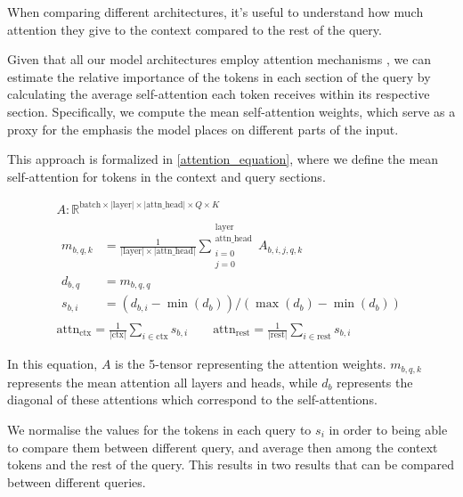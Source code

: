 When comparing different architectures, it's useful to understand how much attention they give to the context compared to the rest of the query.

Given that all our model architectures employ attention mechanisms \citep{flant5,llama3}, we can estimate the relative importance of the tokens in each section of the query by calculating the average self-attention each token receives within its respective section.
Specifically, we compute the mean self-attention weights, which serve as a proxy for the emphasis the model places on different parts of the input.

This approach is formalized in \cref{attention_equation}, where we define the mean self-attention for tokens in the context and query sections.

\begin{equation}
	\newcommand{\lenmod}[1]{\left| \text{#1} \right|}
	\begin{gathered}
		A : \mathbb{R} ^ { \text{batch} \times \lenmod{layer}  \times \lenmod{attn\_head} \times Q \times K } \\[1ex]
		\begin{aligned}
			m_{b,q,k} &= \frac{1}{ \lenmod{layer} \times \lenmod{attn\_head} } \sum^{\substack{\text{layer} \\ \text{attn\_head}}}_{\substack{i = 0 \\ j = 0}} A_{b,i,j,q,k} \\
			d_{b, q} &= m_{b, q, q} \\
			s_{b, i} &= \left(d_{b, i} - \min{\left( d_b \right)}\right) / \left(\max{\left( d_b \right)} - \min{\left( d_b \right)} \right)
		\end{aligned} \\[1em]
		\text{attn}_\text{ctx} = \frac{1}{\lenmod{ctx}} \sum_{i \in \text{ctx}} s_{b,i} \qquad
		\text{attn}_\text{rest} = \frac{1}{\lenmod{rest}} \sum_{i \in \text{rest}} s_{b,i} \qquad
	\end{gathered}
	\label{attention_equation}
\end{equation}

In this equation, $A$ is the 5-tensor representing the attention weights.
$m_{b,q,k}$ represents the mean attention all layers and heads, while $d_b$ represents the diagonal of these attentions which correspond to the self-attentions.

We normalise the values for the tokens in each query to $s_i$ in order to being able to compare them between different query, and average then among the context tokens and the rest of the query.
This results in two results that can be compared between different queries.

